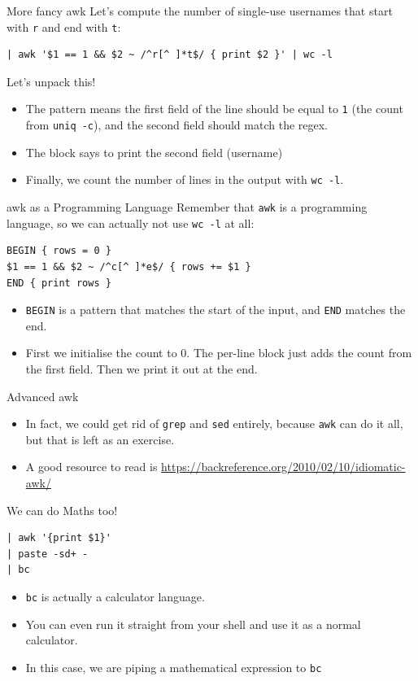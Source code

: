 \documentclass[12pt]{beamer}
\begin{document}
\begin{frame}[fragile]{More fancy awk}
  Let’s compute the number of single-use usernames that start with \texttt{r} and end with \texttt{t}:
  \begin{verbatim}
| awk '$1 == 1 && $2 ~ /^r[^ ]*t$/ { print $2 }' | wc -l
  \end{verbatim}

  Let's unpack this!
  \begin{itemize}
    \item The pattern means the first field of the line should be equal to \texttt{1} (the count from \texttt{uniq -c}), and the second field should match the regex.
    \item The block says to print the second field (username)
    \item Finally, we count the number of lines in the output with \texttt{wc -l}.
  \end{itemize}
\end{frame}

\begin{frame}[fragile]{awk as a Programming Language}
  Remember that \texttt{awk} is a programming language, so we can actually not use \texttt{wc -l} at all:
  \begin{verbatim}
BEGIN { rows = 0 }
$1 == 1 && $2 ~ /^c[^ ]*e$/ { rows += $1 }
END { print rows }
  \end{verbatim}
  \begin{itemize}
    \item \texttt{BEGIN} is a pattern that matches the start of the input, and \texttt{END} matches the end.
    \item First we initialise the count to 0. The per-line block just adds the count from the first field. Then we print it out at the end.
  \end{itemize}
\end{frame}

\begin{frame}{Advanced awk}
  \begin{itemize}
    \item In fact, we could get rid of \texttt{grep} and \texttt{sed} entirely, because \texttt{awk} can do it all, but that is left as an exercise.
    \item A good resource to read is \url{https://backreference.org/2010/02/10/idiomatic-awk/}
  \end{itemize}
\end{frame}

\begin{frame}[fragile]{We can do Maths too!}
  \begin{verbatim}
| awk '{print $1}'
| paste -sd+ -
| bc
  \end{verbatim}
  \begin{itemize}
    \item \texttt{bc} is actually a calculator language.
    \item You can even run it straight from your shell and use it as a normal calculator.
    \item In this case, we are piping a mathematical expression to \texttt{bc}
  \end{itemize}
\end{frame}
\end{document}
